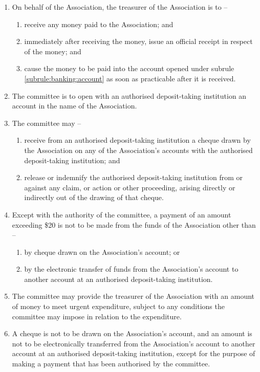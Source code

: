 \documentclass[a4paper,11pt]{article}
\begin{document}
\begin{enumerate}
	\item On behalf of the Association, the treasurer of the Association is to --
	\begin{enumerate}
		\item receive any money paid to the Association; and
		\item immediately after receiving the money, issue an official receipt in respect of the money; and
		\item cause the money to be paid into the account opened under subrule \ref{subrule:banking:account} as soon as practicable after it is received.
	\end{enumerate}
	
	\item \label{subrule:banking:account} The committee is to open with an authorised deposit-taking institution an account in the name of the Association.
	
	\item The committee may --
	\begin{enumerate}
		\item receive from an authorised deposit-taking institution a cheque drawn by the Association on any of the Association's accounts with the authorised deposit-taking institution; and
		\item release or indemnify the authorised deposit-taking institution from or against any claim, or action or other proceeding, arising directly or indirectly out of the drawing of that cheque.
	\end{enumerate}
	
	\item Except with the authority of the committee, a payment of an amount exceeding \$20 is not to be made from the funds of the Association other than --
	\begin{enumerate}
		\item by cheque drawn on the Association's account; or
		\item by the electronic transfer of funds from the Association's account to another account at an authorised deposit-taking institution.
	\end{enumerate}
	
	\item The committee may provide the treasurer of the Association with an amount of money to meet urgent expenditure, subject to any conditions the committee may impose in relation to the expenditure.
	\item A cheque is not to be drawn on the Association's account, and an amount is not to be electronically transferred from the Association's account to another account at an authorised deposit-taking institution, except for the purpose of making a payment that has been authorised by the committee.


\end{enumerate}
\end{document}

